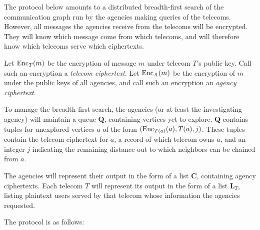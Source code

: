 \label{sec:proto1}



The protocol below amounts to a distributed breadth-first search of the communication graph run by the agencies making queries of the telecoms. However, all messages the agencies receive from the telecoms will be encrypted. They will know which message come from which telecoms, and will therefore know which telecoms serve which ciphertexts.



Let $\operatorname{Enc}_T(m)$ be the encryption of message $m$ under telecom $T$'s public key. Call such an encryption a \emph{telecom ciphertext}. Let $\operatorname{Enc}_\mathcal{A}(m)$ be the encryption of $m$ under the public keys of all agencies, and call such an encryption an \emph{agency ciphertext}.



To manage the breadth-first search, the agencies (or at least the investigating agency) will maintain a queue $\mathbf{Q}$, containing vertices yet to explore. $\mathbf{Q}$ contains tuples for unexplored vertices $a$ of the form $(\operatorname{Enc}_{T(a)}(a), T(a), j)$. These tuples contain the telecom ciphertext for $a$, a record of which telecom owns $a$, and an integer $j$ indicating the remaining distance out to which neighbors can be chained from $a$.



The agencies will represent their output in the form of a list $\mathbf{C}$, containing agency ciphertexts. Each telecom $T$ will represent its output in the form of a list $\mathbf{L}_T$, listing plaintext users served by that telecom whose information the agencies requested.



The protocol is as follows:



